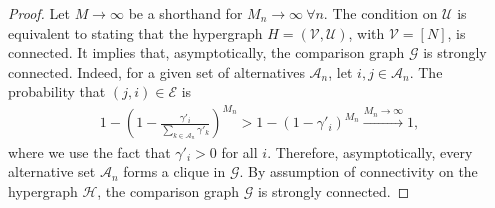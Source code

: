 \begin{proof}
Let $M \to \infty$ be a shorthand for $M_n \to \infty \ \forall n$.
The condition on $\mathcal{U}$ is equivalent to stating that the hypergraph $H = (\mathcal{V}, \mathcal{U})$, with $\mathcal{V} = [N]$, is connected.
It implies that, asymptotically, the comparison graph $\mathcal{G}$ is strongly connected.
Indeed, for a given set of alternatives $\mathcal{A}_n$, let $i, j \in \mathcal{A}_n$.
The probability that $(j, i) \in \mathcal{E}$ is
\begin{align*}
1 - \left(1 - \frac{\gamma'_i}{\sum_{k \in \mathcal{A}_n} \gamma'_k} \right)^{M_n}
> 1 - (1 - \gamma'_i)^{M_n}
\xrightarrow{M_n \to \infty} 1,
\end{align*}
where we use the fact that $\gamma'_i > 0$ for all $i$.
Therefore, asymptotically, every alternative set $\mathcal{A}_n$ forms a clique in $\mathcal{G}$.
By assumption of connectivity on the hypergraph $\mathcal{H}$, the comparison graph $\mathcal{G}$ is strongly connected.


\end{proof}
